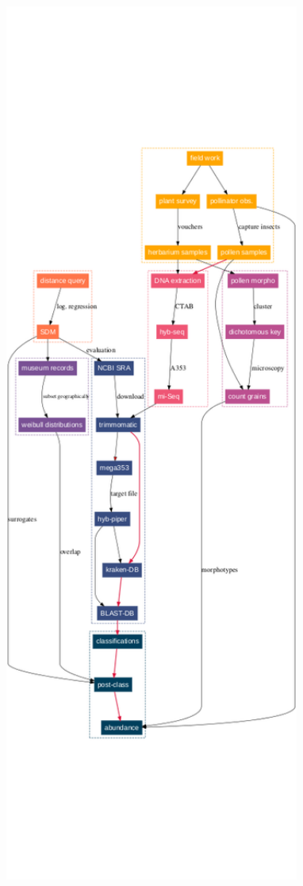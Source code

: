 \documentclass[
]{article}
\begin{document}
\includegraphics[width=5.83in,height=1.25\textheight]{../graphics/plots/flowchart}
\end{document}
